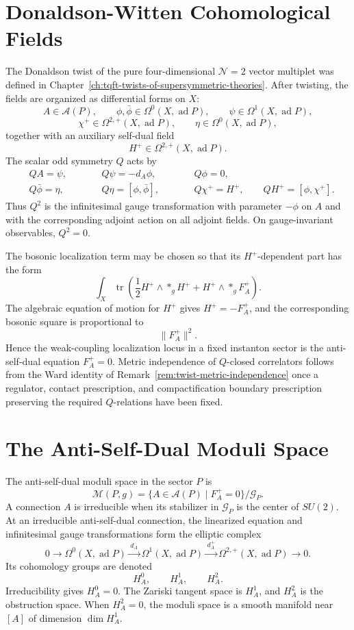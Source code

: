 \section{Donaldson-Witten Cohomological Fields}

The Donaldson twist of the pure four-dimensional \(\mathcal N=2\) vector
multiplet was defined in
Chapter~\ref{ch:tqft-twists-of-supersymmetric-theories}.  After twisting,
the fields are organized as differential forms on \(X\):
\[
  A\in\mathcal A(P),\qquad
  \phi,\bar\phi\in\Omega^0(X,\operatorname{ad}P),\qquad
  \psi\in\Omega^1(X,\operatorname{ad}P),
\]
\[
  \chi^+\in\Omega^{2,+}(X,\operatorname{ad}P),\qquad
  \eta\in\Omega^0(X,\operatorname{ad}P),
\]
together with an auxiliary self-dual field
\[
  H^+\in\Omega^{2,+}(X,\operatorname{ad}P).
\]
The scalar odd symmetry \(Q\) acts by
\[
\begin{aligned}
  &QA=\psi,\qquad &&Q\psi=-d_A\phi,\qquad &&Q\phi=0,\\
  &Q\bar\phi=\eta,\qquad &&Q\eta=[\phi,\bar\phi],\qquad
  &&Q\chi^+=H^+,\qquad QH^+=[\phi,\chi^+] .
\end{aligned}
\]
Thus \(Q^2\) is the infinitesimal gauge transformation with parameter
\(-\phi\) on \(A\) and with the corresponding adjoint action on all adjoint
fields.  On gauge-invariant observables, \(Q^2=0\).

The bosonic localization term may be chosen so that its \(H^+\)-dependent part
has the form
\[
  \int_X\operatorname{tr}\left(
  \frac{1}{2}H^+\wedge *_gH^+
  +H^+\wedge *_gF_A^+
  \right).
\]
The algebraic equation of motion for \(H^+\) gives \(H^+=-F_A^+\), and the
corresponding bosonic square is proportional to
\[
  \|F_A^+\|^2 .
\]
Hence the weak-coupling localization locus in a fixed instanton sector is the
anti-self-dual equation \(F_A^+=0\).  Metric independence of \(Q\)-closed
correlators follows from the Ward identity of
Remark~\ref{rem:twist-metric-independence} once a regulator, contact
prescription, and compactification boundary prescription preserving the
required \(Q\)-relations have been fixed.

\section{The Anti-Self-Dual Moduli Space}

The anti-self-dual moduli space in the sector \(P\) is
\[
  \mathcal M(P,g)
  =
  \{A\in\mathcal A(P)\mid F_A^+=0\}/\mathcal G_P .
\]
A connection \(A\) is irreducible when its stabilizer in \(\mathcal G_P\) is
the center of \(SU(2)\).  At an irreducible anti-self-dual connection, the
linearized equation and infinitesimal gauge transformations form the elliptic
complex
\[
  0\longrightarrow
  \Omega^0(X,\operatorname{ad}P)
  \xrightarrow{\,d_A\,}
  \Omega^1(X,\operatorname{ad}P)
  \xrightarrow{\,d_A^+\,}
  \Omega^{2,+}(X,\operatorname{ad}P)
  \longrightarrow0 .
\]
Its cohomology groups are denoted
\[
  H_A^0,\qquad H_A^1,\qquad H_A^2 .
\]
Irreducibility gives \(H_A^0=0\).  The Zariski tangent space is \(H_A^1\), and
\(H_A^2\) is the obstruction space.  When \(H_A^2=0\), the moduli space is a
smooth manifold near \([A]\) of dimension \(\dim H_A^1\).


